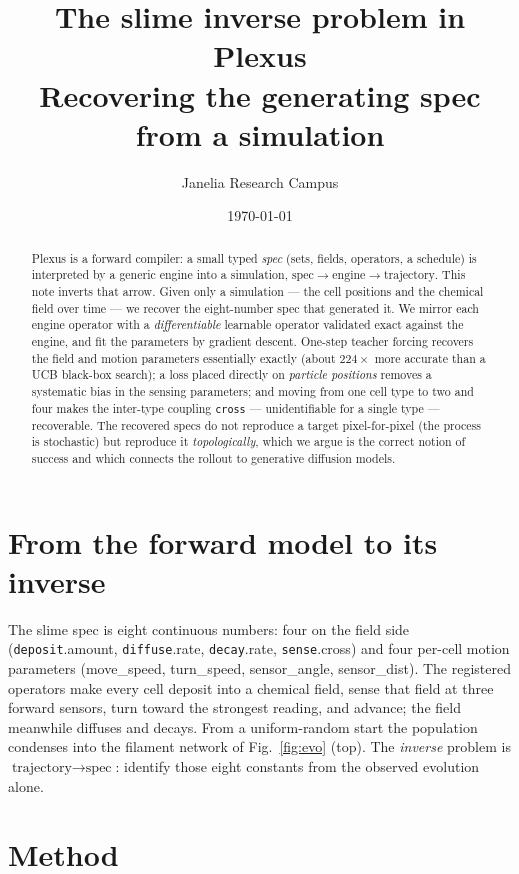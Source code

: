 \documentclass[11pt]{article}
\title{\textbf{The slime inverse problem in Plexus}\\[3pt]
\large Recovering the generating spec from a simulation}
\author{Janelia Research Campus}
\date{\today}
\newcommand{\op}[1]{\textcolor{cop}{\texttt{#1}}}
\begin{document}
\maketitle

\begin{abstract}
Plexus is a forward compiler: a small typed \emph{spec} (sets, fields, operators, a
schedule) is interpreted by a generic engine into a simulation, $\text{spec}\to
\text{engine}\to\text{trajectory}$. This note inverts that arrow. Given only a
simulation --- the cell positions and the chemical field over time --- we recover the
eight-number spec that generated it. We mirror each engine operator with a
\emph{differentiable} learnable operator validated exact against the engine, and fit
the parameters by gradient descent. One-step teacher forcing recovers the field and
motion parameters essentially exactly (about $224\times$ more accurate than a UCB
black-box search); a loss placed directly on \emph{particle positions} removes a
systematic bias in the sensing parameters; and moving from one cell type to two and
four makes the inter-type coupling \op{cross} --- unidentifiable for a single type ---
recoverable. The recovered specs do not reproduce a target pixel-for-pixel (the process
is stochastic) but reproduce it \emph{topologically}, which we argue is the correct
notion of success and which connects the rollout to generative diffusion models.
\end{abstract}

\section{From the forward model to its inverse}

The slime spec is eight continuous numbers: four on the field side
(\op{deposit}.amount, \op{diffuse}.rate, \op{decay}.rate, \op{sense}.cross) and four
per-cell motion parameters (move\_speed, turn\_speed, sensor\_angle, sensor\_dist).
The registered operators make every cell deposit into a chemical field, sense that
field at three forward sensors, turn toward the strongest reading, and advance; the
field meanwhile diffuses and decays. From a uniform-random start the population
condenses into the filament network of Fig.~\ref{fig:evo} (top). The \emph{inverse}
problem is $\text{trajectory}\to\text{spec}$: identify those eight constants from the
observed evolution alone.

\section{Method}
\end{document}
